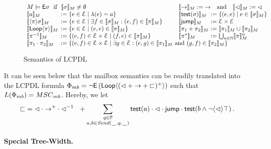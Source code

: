 \documentclass[a4paper,UKenglish,cleveref, autoref, thm-restate]{lipics-v2021}
\begin{document}
\begin{figure}[t]
\centering
\def\arraystretch{1.2}
$\begin{array}{ll}
M \models \Exists \sigma  \text{~ if ~} \sem{\sigma}_\msc \neq \emptyset &
\llbracket \to \rrbracket_\msc := {\to} \text{~~ and ~~} \llbracket \lhd \rrbracket_\msc := {\lhd}\\
\makebox[5.3em][l]{$\sem{a}_\msc$} := \{e \in \Events \mid \lambda(e) = a\} &
\makebox[5em][l]{$\sem{\test{\sigma}}_\msc$} := \{ (e,e) \mid e \in \llbracket \sigma \rrbracket _\msc\}\\
\makebox[5.3em][l]{$\sem{\langle \pi \rangle \sigma}_\msc$} := \{e \in \Events \mid \exists f \in \sem{\sigma}_\msc: (e,f) \in \sem{\pi}_\msc \}~~~~~ &
\makebox[5em][l]{$\llbracket \jump \rrbracket_\msc$} := \Events \times \Events\\
\makebox[5.3em][l]{$\sem{\Loop{\pi}}_\msc$} := \{e \in \Events \mid (e, e) \in \sem{\pi}_\msc\} &
\makebox[5em][l]{$\llbracket \pi_1 + \pi_2 \rrbracket_\msc$} := \llbracket \pi_1\rrbracket_\msc \cup \llbracket \pi_2 \rrbracket_\msc \\
\makebox[5.3em][l]{$\llbracket \inv{\pi} \rrbracket_\msc$} := \{ (e, f) \in \Events \times \Events \mid (f,e) \in \llbracket \pi \rrbracket_\msc\} &
\makebox[5em][l]{$\llbracket \pi^* \rrbracket_\msc$} := \bigcup_{n \in \mathbb{N}}\llbracket \pi \rrbracket_\msc^n\\
\multicolumn{2}{l}{\makebox[5.3em][l]{$\llbracket \pi_1 \cdot \pi_2 \rrbracket_\msc$} := \{(e,f) \in \Events \times \Events \mid \exists g \in \Events : (e,g) \in \llbracket \pi_1 \rrbracket_\msc \text{~and~} (g, f) \in \llbracket \pi_2 \rrbracket_\msc\}  }
\end{array}$
\caption{Semantics of LCPDL\label{fig:sem-lcpdl}}
\end{figure}

It can be seen below that the mailbox semantics can be readily translated into the LCPDL formula
$\mbFormula = \neg \Exists\, (\Loop{({\lhd} + {\procrel} + {\sqsubset})^+})$
such that $L(\mbFormula) = \mbMSCs$. Hereby, we let
\[{\sqsubset} = {\lhd} \cdot {\to^+} \cdot {\lhd^{-1}} ~~+ \sum_{\substack{q \in \mathbb{P}\\a,b \in {\mathit{Send}(\hspace{0.1em}\underline{\hspace{0.5em}}\hspace{0.1em},q,\hspace{0.1em}\underline{\hspace{0.5em}}\hspace{0.1em})}}} \textsf{test}(a) \cdot {\lhd} \cdot \textsf{jump} \cdot \textsf{test}(b \wedge \neg \langle \lhd \rangle \top)\,.\]

\paragraph*{Special Tree-Width.}
\end{document}
